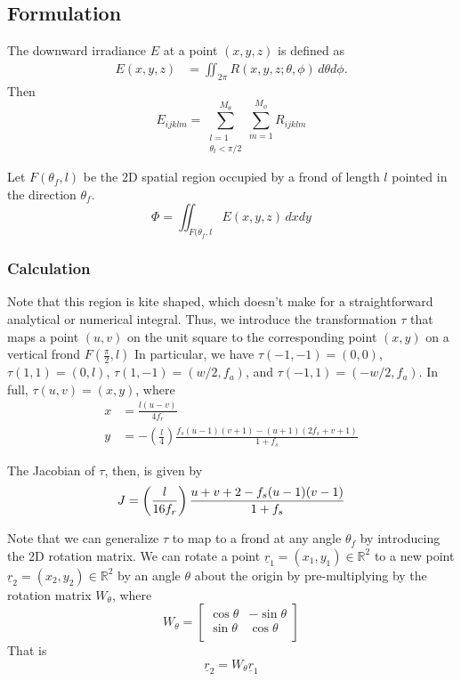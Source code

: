 \documentclass[10pt]{article}
\newcommand\R{\mathbb{R}}
\begin{document}
\begin{multicols}{2}
\subsection{Formulation}
The downward irradiance $E$  at a point $(x,y,z)$ is defined as
\begin{align}
	E(x,y,z) &= \iint_{2\pi} R(x,y,z;\theta,\phi)\,d\theta d\phi.
\end{align}
Then
\begin{equation}
	E_{ijklm}= \sum_{\substack{l=1 \\ \theta_l < \pi/2}}^{M_\theta}\sum_{m=1}^{M_\phi} R_{ijklm}
\end{equation}

Let $F(\theta_f,l)$ be the 2D spatial region occupied by a frond of length $l$ pointed in the direction $\theta_f$.
\begin{equation}
	\Phi = \iint_{F(\theta_f,l} E(x,y,z)\,dxdy
\end{equation}

\subsubsection{Calculation}
Note that this region is kite shaped, which doesn't make for a straightforward analytical or numerical integral.
Thus, we introduce the transformation $\tau$ that maps a point $(u,v)$ on the unit square to the corresponding point $(x,y)$ on a vertical frond $F(\frac{\pi}{2},l)$
In particular, we have $\tau(-1,-1) = (0,0)$, $\tau(1,1) = (0,l)$, $\tau(1,-1) = (w/2,f_a)$, and $\tau(-1,1) = (-w/2,f_a)$.
In full, $\tau(u,v) = (x,y)$, where
\begin{align}
	x &= \frac{l(u-v)}{4f_r} \\
	y &= -\left(\frac{l}{4}\right) \frac{f_s(u-1)(v+1) - (u+1)(2f_s + v + 1)}{1+f_s}
\end{align}

The Jacobian of $\tau$, then, is given by
\begin{equation}
	J = \left(\frac{l}{16f_r}\right) \frac{u + v + 2 - f_s(u-1)(v-1)}{1+f_s} \\
\end{equation}

Note that we can generalize $\tau$ to map to a frond at any angle $\theta_f$ by introducing the 2D rotation matrix.
We can rotate a point $\underline{r}_1 = (x_1,y_1) \in \R^2$ to a new point $\underline{r}_2 = (x_2,y_2) \in \R^2$ by an angle $\theta$ about the origin by pre-multiplying by the rotation matrix $W_{\theta}$, where
\begin{equation}
	W_{\theta} = \left[ \begin{array}{cc}
		\cos\theta & -\sin\theta \\
		\sin\theta & \cos\theta \\
	\end{array} \right]
\end{equation}
That is
\begin{equation}
	\underline{r}_2 = W_{\theta} \underline{r}_1
\end{equation}


\end{multicols}
\end{document}
